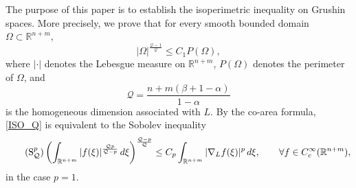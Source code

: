 \documentclass[12pt]{amsart}
\theoremstyle{plain}
\newtheorem{theorem}{Theorem}[section]
\theoremstyle{definition}
\numberwithin{equation}{section}
\begin{document}

The purpose of this paper is to establish the isoperimetric inequality on Grushin spaces. More precisely, we prove that for every smooth bounded domain \(\Omega\subset \mathbb{R}^{n+m}\),
\begin{equation}\label{ISO_Q}
    |\Omega|^{\frac{\mathcal{Q}-1}{\mathcal{Q}}} \le C_1 P(\Omega),
\end{equation}
where \(|\cdot|\) denotes the Lebesgue measure on \(\mathbb{R}^{n+m}\), \(P(\Omega)\) denotes the perimeter of \(\Omega\), and
\begin{equation}\label{Q}
    \mathcal{Q} = \frac{n+m(\beta+1-\alpha)}{1-\alpha}
\end{equation}
is the homogeneous dimension associated with \(L\). By the co-area formula, \eqref{ISO_Q} is equivalent to the Sobolev inequality
\begin{equation}\label{S_p}\tag{$\mathrm{S}_{\mathcal{Q}}^p$}
\left(\int_{\mathbb{R}^{n+m}} |f(\xi)|^{\frac{\mathcal{Q}p}{\mathcal{Q}-p}} \, d\xi \right)^{\frac{\mathcal{Q}-p}{\mathcal{Q}}}
\le
C_p \int_{\mathbb{R}^{n+m}} |\nabla_L f(\xi)|^p \, d\xi,
\qquad \forall f\in C_c^\infty(\mathbb{R}^{n+m}),
\end{equation}
in the case \(p=1\).


\end{document}

